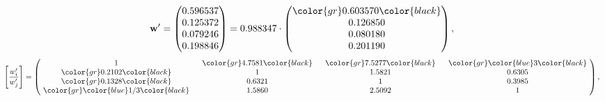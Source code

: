 \begin{example}
\begin{equation*}
\mathbf{w}^{\prime} =
\begin{pmatrix}
0.596537\\
0.125372\\
0.079246\\
0.198846
\end{pmatrix} =
0.988347\cdot
\begin{pmatrix}
\color{gr} 0.603570\color{black} \\
0.126850\\
0.080180\\
0.201190
\end{pmatrix},
\end{equation*}
\begin{equation*}
\left[ \frac{{w}^{\prime}_i}{{w}^{\prime}_j} \right] =
\begin{pmatrix}
$\,\,$ 1 $\,\,$ & $\,\,$\color{gr} 4.7581\color{black} $\,\,$ & $\,\,$\color{gr} 7.5277\color{black} $\,\,$ & $\,\,$\color{gr} \color{blue} 3\color{black} $\,\,$ \\
$\,\,$\color{gr} 0.2102\color{black} $\,\,$ & $\,\,$ 1 $\,\,$ & $\,\,$1.5821$\,\,$ & $\,\,$0.6305  $\,\,$ \\
$\,\,$\color{gr} 0.1328\color{black} $\,\,$ & $\,\,$0.6321$\,\,$ & $\,\,$ 1 $\,\,$ & $\,\,$0.3985 $\,\,$ \\
$\,\,$\color{gr} \color{blue}  1/3\color{black} $\,\,$ & $\,\,$1.5860$\,\,$ & $\,\,$2.5092$\,\,$ & $\,\,$ 1  $\,\,$ \\
\end{pmatrix},
\end{equation*}
\end{example}
\newpage
